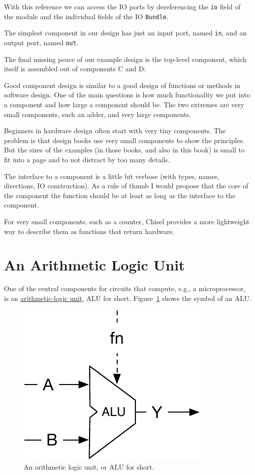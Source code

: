 \documentclass[%
    10pt, %
    headinclude, footexclude,
    openright, %
    notitlepage,
    cleardoubleempty,
    headsepline,
    pointlessnumbers,
    bibtotoc, idxtotoc,
    ]{scrbook}
\newcommand{\code}[1]{{\small{\texttt{#1}}}}
\newcommand{\scale}{0.7}
\newcommand{\myref}[2]{\href{#1}{#2}}
\begin{document}
With this reference we can access the IO ports by dereferencing the \code{io} field of the module
and the individual fields of the IO \code{Bundle}.

The simplest component in our design has just an input port, named \code{in}, and
an output port, named \code{out}.



The final missing peace of our example design is the top-level component, which itself
is assembled out of components C and D:



Good component design is similar to a good design of functions or methods in
software design. One of the main questions is how much functionality we put into
a component and how large a component should be. The two extremes are very
small components, such an adder, and very large components.

Beginners in hardware design often start with very tiny components.
The problem is that design books use very small components to show the principles.
But the sizes of the examples (in those books, and also in this book) is small
to fit into a page and to not distract by too many details.

The interface to a component is a little bit verbose (with types, names, directions,
IO construction). As a rule of thumb I would propose that the core of the component
the function should be at least as long as the interface to the component.

For very small components, such as a counter, Chisel provides a more lightweight
way to describe them as functions that return hardware.


\section{An Arithmetic Logic Unit}

One of the central components for circuits that compute, e.g., a microprocessor, is an
\myref{https://en.wikipedia.org/wiki/Arithmetic_logic_unit}{arithmetic-logic unit},
ALU for short. Figure~\ref{fig:alu} shows the symbol of an ALU.

\begin{figure}
  \centering
  \includegraphics[scale=\scale]{figures/alu}
  \caption{An arithmetic logic unit, or ALU for short.}
  \label{fig:alu}
\end{figure}
\end{document}
